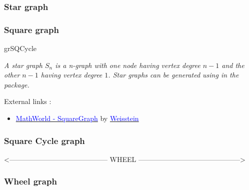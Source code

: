 \subsubsection{Star graph}
\begin{center}
  \begin{tkzexample}[vbox]
\end{tkzexample}
\end{center}
\newpage
\subsubsection{Square graph}

 \begin{NewMacroBox}{grSQCycle}{}

\medskip
\emph{A star graph $S_n$ is a n-graph   with one node having vertex degree $n-1$  and the other $n-1$   having vertex degree $1$. Star graphs can be generated using  in   the  package.}

\medskip
External links :

\medskip
\begin{itemize}
\item \href{http://mathworld.wolfram.com/SquareGraph.html}%
           {\textcolor{blue}{MathWorld - SquareGraph}} by %
      \href{http://en.wikipedia.org/wiki/Eric_W._Weisstein}%
           {\textcolor{blue}{Weisstein}}
\end{itemize}
\end{NewMacroBox}

\subsubsection{Square Cycle graph}
\begin{center}
\begin{tkzexample}[vbox]
\end{tkzexample}
\end{center}
<––––––––––––––––––––––––––––     WHEEL     –––––––––––––––––––––––––––––>
\newpage
\subsubsection{Wheel graph}

